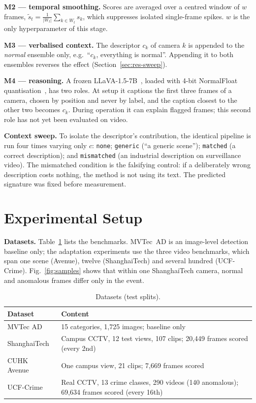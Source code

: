 \documentclass[conference]{IEEEtran}
\begin{document}
\textbf{M2 --- temporal smoothing.} Scores are averaged over a centred window of
$w$ frames, $\tilde s_t=\frac{1}{|W_t|}\sum_{k\in W_t}s_k$, which suppresses
isolated single-frame spikes. $w$ is the only hyperparameter of this stage.

\textbf{M3 --- verbalised context.} The descriptor $c_k$ of camera $k$ is
appended to the \emph{normal} ensemble only, e.g.\ ``$c_k$, everything is
normal''. Appending it to both ensembles reverses the effect
(Section~\ref{sec:res-sweep}).

\textbf{M4 --- reasoning.} A frozen LLaVA-1.5-7B~\cite{liu2023llava}, loaded
with 4-bit NormalFloat quantisation~\cite{dettmers2023qlora}, has two roles. At
setup it captions the first three frames of a camera, chosen by position and
never by label, and the caption closest to the other two becomes $c_k$. During
operation it can explain flagged frames; this second role has not yet been
evaluated on video.

\textbf{Context sweep.} To isolate the descriptor's contribution, the identical
pipeline is run four times varying only $c$: \texttt{none}; \texttt{generic}
(``a generic scene''); \texttt{matched} (a correct description); and
\texttt{mismatched} (an industrial description on surveillance video). The
mismatched condition is the falsifying control: if a deliberately wrong
description costs nothing, the method is not using its text. The predicted
signature was fixed before measurement.

\section{Experimental Setup}

\textbf{Datasets.} Table~\ref{tab:data} lists the benchmarks. MVTec~AD is an
image-level detection baseline only; the adaptation experiments use the three
video benchmarks, which span one scene (Avenue), twelve
(ShanghaiTech) and several hundred (UCF-Crime). Fig.~\ref{fig:samples} shows
that within one ShanghaiTech camera, normal and anomalous frames differ only in
the event.

\begin{table}[t]
\caption{Datasets (test splits).}
\label{tab:data}
\centering\footnotesize
\begin{tabular}{@{}p{1.75cm}p{5.5cm}@{}}
\toprule
\textbf{Dataset} & \textbf{Content} \\
\midrule
MVTec AD~\cite{bergmann2019mvtec} & 15 categories, 1{,}725 images; baseline only \\
ShanghaiTech~\cite{liu2018shanghaitech} & Campus CCTV, 12 test views, 107 clips;
20{,}449 frames scored (every 2nd) \\
CUHK Avenue~\cite{lu2013avenue} & One campus view, 21 clips; 7{,}669 frames scored \\
UCF-Crime~\cite{sultani2018ucfcrime} & Real CCTV, 13 crime classes, 290 videos
(140 anomalous); 69{,}634 frames scored (every 16th) \\
\bottomrule
\end{tabular}
\end{table}
\end{document}
